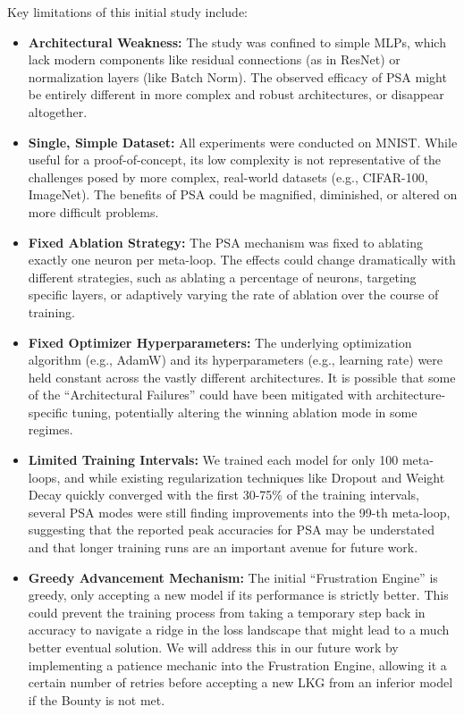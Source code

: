 \documentclass[conference]{IEEEtran}
\begin{document}
Key limitations of this initial study include:
\begin{itemize}
    \item \textbf{Architectural Weakness:} The study was confined to simple MLPs, which lack modern components like residual connections (as in ResNet)\cite{b8} or normalization layers (like Batch Norm)\cite{b10}. The observed efficacy of PSA might be entirely different in more complex and robust architectures, or disappear altogether.
    \item \textbf{Single, Simple Dataset:} All experiments were conducted on MNIST. While useful for a proof-of-concept, its low complexity is not representative of the challenges posed by more complex, real-world datasets (e.g., CIFAR-100, ImageNet). The benefits of PSA could be magnified, diminished, or altered on more difficult problems.
    \item \textbf{Fixed Ablation Strategy:} The PSA mechanism was fixed to ablating exactly one neuron per meta-loop. The effects could change dramatically with different strategies, such as ablating a percentage of neurons, targeting specific layers, or adaptively varying the rate of ablation over the course of training.
    \item \textbf{Fixed Optimizer Hyperparameters:} The underlying optimization algorithm (e.g., AdamW) and its hyperparameters (e.g., learning rate) were held constant across the vastly different architectures. It is possible that some of the ``Architectural Failures'' could have been mitigated with architecture-specific tuning, potentially altering the winning ablation mode in some regimes.
    \item \textbf{Limited Training Intervals:} We trained each model for only 100 meta-loops, and while existing regularization techniques like Dropout and Weight Decay quickly converged with the first 30-75\% of the training intervals, several PSA modes were still finding improvements into the 99-th meta-loop, suggesting that the reported peak accuracies for PSA may be understated and that longer training runs are an important avenue for future work.
    \item \textbf{Greedy Advancement Mechanism:} The initial ``Frustration Engine'' is greedy, only accepting a new model if its performance is strictly better. This could prevent the training process from taking a temporary step back in accuracy to navigate a ridge in the loss landscape that might lead to a much better eventual solution. We will address this in our future work by implementing a patience mechanic into the Frustration Engine, allowing it a certain number of retries before accepting a new LKG from an inferior model if the Bounty is not met.
\end{itemize}
\end{document}
